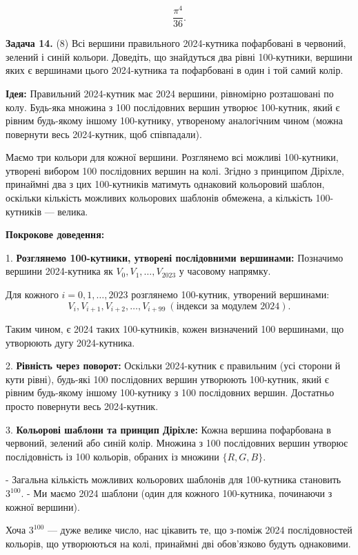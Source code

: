 \documentclass{article}
\begin{document}
\[
\boxed{\frac{\pi^4}{36}}.
\]

\bigskip

\noindent\textbf{Задача 14.} (8) Всі вершини правильного 2024-кутника пофарбовані в червоний, зелений і синій кольори. Доведіть, що знайдуться два рівні 100-кутники, вершини яких є вершинами цього 2024-кутника та пофарбовані в один і той самий колір.

\textbf{Ідея:}  
Правильний 2024-кутник має 2024 вершини, рівномірно розташовані по колу. Будь-яка множина з 100 послідовних вершин утворює 100-кутник, який є рівним будь-якому іншому 100-кутнику, утвореному аналогічним чином (можна повернути весь 2024-кутник, щоб співпадали). 

Маємо три кольори для кожної вершини. Розглянемо всі можливі 100-кутники, утворені вибором 100 послідовних вершин на колі. Згідно з принципом Діріхле, принаймні два з цих 100-кутників матимуть однаковий кольоровий шаблон, оскільки кількість можливих кольорових шаблонів обмежена, а кількість 100-кутників — велика.

\textbf{Покрокове доведення:}

1. \textbf{Розглянемо 100-кутники, утворені послідовними вершинами:}  
   Позначимо вершини 2024-кутника як \(V_0, V_1, \dots, V_{2023}\) у часовому напрямку.  

   Для кожного \(i = 0, 1, \dots, 2023\) розглянемо 100-кутник, утворений вершинами:
   \[
   V_i, V_{i+1}, V_{i+2}, \dots, V_{i+99} \ (\text{індекси за модулем }2024).
   \]

   Таким чином, є 2024 таких 100-кутників, кожен визначений 100 вершинами, що утворюють дугу 2024-кутника.

2. \textbf{Рівність через поворот:}  
   Оскільки 2024-кутник є правильним (усі сторони й кути рівні), будь-які 100 послідовних вершин утворюють 100-кутник, який є рівним будь-якому іншому 100-кутнику з 100 послідовних вершин. Достатньо просто повернути весь 2024-кутник.

3. \textbf{Кольорові шаблони та принцип Діріхле:}  
   Кожна вершина пофарбована в червоний, зелений або синій колір. Множина з 100 послідовних вершин утворює послідовність із 100 кольорів, обраних із множини \(\{R, G, B\}\).

   - Загальна кількість можливих кольорових шаблонів для 100-кутника становить \(3^{100}\).
   - Ми маємо 2024 шаблони (один для кожного 100-кутника, починаючи з кожної вершини).

   Хоча \(3^{100}\) — дуже велике число, нас цікавить те, що з-поміж 2024 послідовностей кольорів, що утворюються на колі, принаймні дві обов’язково будуть однаковими.
\end{document}
